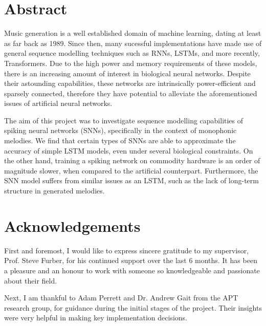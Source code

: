 \documentclass[../report.tex]{subfiles}
\begin{document}
\section*{Abstract}

Music generation is a well established domain of machine learning, dating at
least as far back as 1989. Since then, many sucessful implementations have made
use of general sequence modelling techniques such as RNNs, LSTMs, and more
recently, Transformers. Due to the high power and memory requirements of these
models, there is an increasing amount of interest in biological neural networks.
Despite their astounding capabilities, these networks are intrinsically
power-efficient and sparsely connected, therefore they have potential to
alleviate the aforementioned issues of artificial neural networks.

The aim of this project was to investigate sequence modelling capabilities of
spiking neural networks (SNNs), specifically in the context of monophonic
melodies. We find that certain types of SNNs are able to approximate the
accuracy of simple LSTM models, even under several biological constraints. On
the other hand, training a spiking network on commodity hardware is an order of
magnitude slower, when compared to the artificial counterpart. Furthermore, the
SNN model suffers from similar issues as an LSTM, such as the lack of long-term
structure in generated melodies.

\section*{Acknowledgements}

First and foremost, I would like to express sincere gratitude to my supervisor,
Prof. Steve Furber, for his continued support over the last 6 months. It has
been a pleasure and an honour to work with someone so knowledgeable and
passionate about their field.

Next, I am thankful to Adam Perrett and Dr. Andrew Gait from the APT research
group, for guidance during the initial stages of the project. Their insights
were very helpful in making key implementation decisions.
\end{document}
